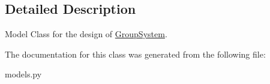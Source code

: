 \subsection{Detailed Description}
Model Class for the design of \hyperlink{classrestriction__system_1_1models_1_1GroupSystem}{Group\+System}. 

The documentation for this class was generated from the following file\+:\begin{DoxyCompactItemize}
\item 
models.\+py\end{DoxyCompactItemize}
